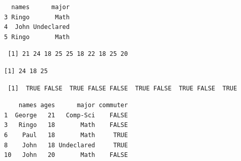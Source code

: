 \documentclass[
  letterpaper,
  DIV=11,
  numbers=noendperiod]{scrreprt}
\newenvironment{Shaded}{\begin{snugshade}}{\end{snugshade}}
\newcommand{\CommentTok}[1]{\textcolor[rgb]{0.37,0.37,0.37}{#1}}
\newcommand{\DecValTok}[1]{\textcolor[rgb]{0.68,0.00,0.00}{#1}}
\newcommand{\NormalTok}[1]{\textcolor[rgb]{0.00,0.23,0.31}{#1}}
\newcommand{\SpecialCharTok}[1]{\textcolor[rgb]{0.37,0.37,0.37}{#1}}
\begin{document}
\begin{verbatim}
  names      major
3 Ringo       Math
4  John Undeclared
5 Ringo       Math
\end{verbatim}

\begin{Shaded}
\end{Shaded}

\begin{verbatim}
 [1] 21 24 18 25 25 18 22 18 25 20
\end{verbatim}

\begin{Shaded}
\end{Shaded}

\begin{verbatim}
[1] 24 18 25
\end{verbatim}

\begin{Shaded}
\end{Shaded}

\begin{verbatim}
 [1]  TRUE FALSE  TRUE FALSE FALSE  TRUE FALSE  TRUE FALSE  TRUE
\end{verbatim}

\begin{Shaded}
\end{Shaded}

\begin{verbatim}
    names ages      major commuter
1  George   21   Comp-Sci    FALSE
3   Ringo   18       Math    FALSE
6    Paul   18       Math     TRUE
8    John   18 Undeclared     TRUE
10   John   20       Math    FALSE
\end{verbatim}
\end{document}
